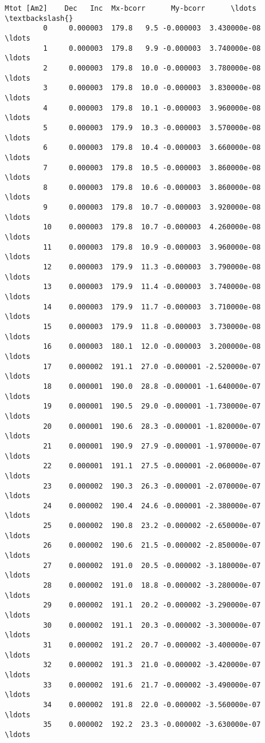 \documentclass{article}
\begin{document}
\begin{Verbatim}[commandchars=\\\{\}]
             Mtot [Am2]    Dec   Inc  Mx-bcorr      My-bcorr      \ldots       \textbackslash{}
         0     0.000003  179.8   9.5 -0.000003  3.430000e-08      \ldots        
         1     0.000003  179.8   9.9 -0.000003  3.740000e-08      \ldots        
         2     0.000003  179.8  10.0 -0.000003  3.780000e-08      \ldots        
         3     0.000003  179.8  10.0 -0.000003  3.830000e-08      \ldots        
         4     0.000003  179.8  10.1 -0.000003  3.960000e-08      \ldots        
         5     0.000003  179.9  10.3 -0.000003  3.570000e-08      \ldots        
         6     0.000003  179.8  10.4 -0.000003  3.660000e-08      \ldots        
         7     0.000003  179.8  10.5 -0.000003  3.860000e-08      \ldots        
         8     0.000003  179.8  10.6 -0.000003  3.860000e-08      \ldots        
         9     0.000003  179.8  10.7 -0.000003  3.920000e-08      \ldots        
         10    0.000003  179.8  10.7 -0.000003  4.260000e-08      \ldots        
         11    0.000003  179.8  10.9 -0.000003  3.960000e-08      \ldots        
         12    0.000003  179.9  11.3 -0.000003  3.790000e-08      \ldots        
         13    0.000003  179.9  11.4 -0.000003  3.740000e-08      \ldots        
         14    0.000003  179.9  11.7 -0.000003  3.710000e-08      \ldots        
         15    0.000003  179.9  11.8 -0.000003  3.730000e-08      \ldots        
         16    0.000003  180.1  12.0 -0.000003  3.200000e-08      \ldots        
         17    0.000002  191.1  27.0 -0.000001 -2.520000e-07      \ldots        
         18    0.000001  190.0  28.8 -0.000001 -1.640000e-07      \ldots        
         19    0.000001  190.5  29.0 -0.000001 -1.730000e-07      \ldots        
         20    0.000001  190.6  28.3 -0.000001 -1.820000e-07      \ldots        
         21    0.000001  190.9  27.9 -0.000001 -1.970000e-07      \ldots        
         22    0.000001  191.1  27.5 -0.000001 -2.060000e-07      \ldots        
         23    0.000002  190.3  26.3 -0.000001 -2.070000e-07      \ldots        
         24    0.000002  190.4  24.6 -0.000001 -2.380000e-07      \ldots        
         25    0.000002  190.8  23.2 -0.000002 -2.650000e-07      \ldots        
         26    0.000002  190.6  21.5 -0.000002 -2.850000e-07      \ldots        
         27    0.000002  191.0  20.5 -0.000002 -3.180000e-07      \ldots        
         28    0.000002  191.0  18.8 -0.000002 -3.280000e-07      \ldots        
         29    0.000002  191.1  20.2 -0.000002 -3.290000e-07      \ldots        
         30    0.000002  191.1  20.3 -0.000002 -3.300000e-07      \ldots        
         31    0.000002  191.2  20.7 -0.000002 -3.400000e-07      \ldots        
         32    0.000002  191.3  21.0 -0.000002 -3.420000e-07      \ldots        
         33    0.000002  191.6  21.7 -0.000002 -3.490000e-07      \ldots        
         34    0.000002  191.8  22.0 -0.000002 -3.560000e-07      \ldots        
         35    0.000002  192.2  23.3 -0.000002 -3.630000e-07      \ldots        
         

\end{Verbatim}
\end{document}
